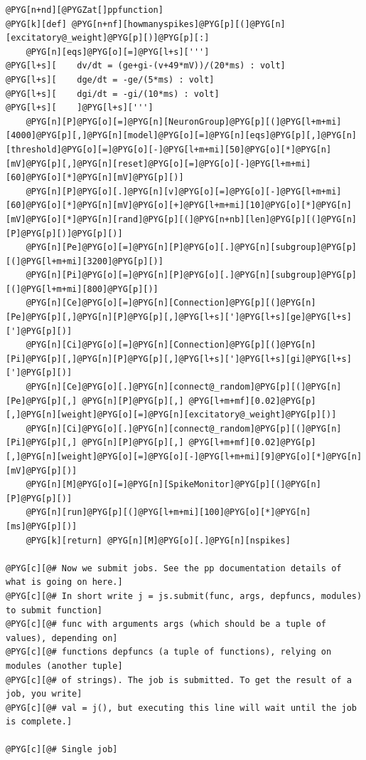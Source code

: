 \documentclass[letterpaper,10pt,english]{manual}
\begin{document}
\begin{Verbatim}[commandchars=@\[\]]
@PYG[n+nd][@PYGZat[]ppfunction]
@PYG[k][def] @PYG[n+nf][howmanyspikes]@PYG[p][(]@PYG[n][excitatory@_weight]@PYG[p][)]@PYG[p][:]
    @PYG[n][eqs]@PYG[o][=]@PYG[l+s][''']
@PYG[l+s][    dv/dt = (ge+gi-(v+49*mV))/(20*ms) : volt]
@PYG[l+s][    dge/dt = -ge/(5*ms) : volt]
@PYG[l+s][    dgi/dt = -gi/(10*ms) : volt]
@PYG[l+s][    ]@PYG[l+s][''']
    @PYG[n][P]@PYG[o][=]@PYG[n][NeuronGroup]@PYG[p][(]@PYG[l+m+mi][4000]@PYG[p][,]@PYG[n][model]@PYG[o][=]@PYG[n][eqs]@PYG[p][,]@PYG[n][threshold]@PYG[o][=]@PYG[o][-]@PYG[l+m+mi][50]@PYG[o][*]@PYG[n][mV]@PYG[p][,]@PYG[n][reset]@PYG[o][=]@PYG[o][-]@PYG[l+m+mi][60]@PYG[o][*]@PYG[n][mV]@PYG[p][)]
    @PYG[n][P]@PYG[o][.]@PYG[n][v]@PYG[o][=]@PYG[o][-]@PYG[l+m+mi][60]@PYG[o][*]@PYG[n][mV]@PYG[o][+]@PYG[l+m+mi][10]@PYG[o][*]@PYG[n][mV]@PYG[o][*]@PYG[n][rand]@PYG[p][(]@PYG[n+nb][len]@PYG[p][(]@PYG[n][P]@PYG[p][)]@PYG[p][)]
    @PYG[n][Pe]@PYG[o][=]@PYG[n][P]@PYG[o][.]@PYG[n][subgroup]@PYG[p][(]@PYG[l+m+mi][3200]@PYG[p][)]
    @PYG[n][Pi]@PYG[o][=]@PYG[n][P]@PYG[o][.]@PYG[n][subgroup]@PYG[p][(]@PYG[l+m+mi][800]@PYG[p][)]
    @PYG[n][Ce]@PYG[o][=]@PYG[n][Connection]@PYG[p][(]@PYG[n][Pe]@PYG[p][,]@PYG[n][P]@PYG[p][,]@PYG[l+s][']@PYG[l+s][ge]@PYG[l+s][']@PYG[p][)]
    @PYG[n][Ci]@PYG[o][=]@PYG[n][Connection]@PYG[p][(]@PYG[n][Pi]@PYG[p][,]@PYG[n][P]@PYG[p][,]@PYG[l+s][']@PYG[l+s][gi]@PYG[l+s][']@PYG[p][)]
    @PYG[n][Ce]@PYG[o][.]@PYG[n][connect@_random]@PYG[p][(]@PYG[n][Pe]@PYG[p][,] @PYG[n][P]@PYG[p][,] @PYG[l+m+mf][0.02]@PYG[p][,]@PYG[n][weight]@PYG[o][=]@PYG[n][excitatory@_weight]@PYG[p][)]
    @PYG[n][Ci]@PYG[o][.]@PYG[n][connect@_random]@PYG[p][(]@PYG[n][Pi]@PYG[p][,] @PYG[n][P]@PYG[p][,] @PYG[l+m+mf][0.02]@PYG[p][,]@PYG[n][weight]@PYG[o][=]@PYG[o][-]@PYG[l+m+mi][9]@PYG[o][*]@PYG[n][mV]@PYG[p][)]
    @PYG[n][M]@PYG[o][=]@PYG[n][SpikeMonitor]@PYG[p][(]@PYG[n][P]@PYG[p][)]
    @PYG[n][run]@PYG[p][(]@PYG[l+m+mi][100]@PYG[o][*]@PYG[n][ms]@PYG[p][)]
    @PYG[k][return] @PYG[n][M]@PYG[o][.]@PYG[n][nspikes]

@PYG[c][@# Now we submit jobs. See the pp documentation details of what is going on here.]
@PYG[c][@# In short write j = js.submit(func, args, depfuncs, modules) to submit function]
@PYG[c][@# func with arguments args (which should be a tuple of values), depending on]
@PYG[c][@# functions depfuncs (a tuple of functions), relying on modules (another tuple]
@PYG[c][@# of strings). The job is submitted. To get the result of a job, you write]
@PYG[c][@# val = j(), but executing this line will wait until the job is complete.]

@PYG[c][@# Single job]


\end{Verbatim}
\end{document}
